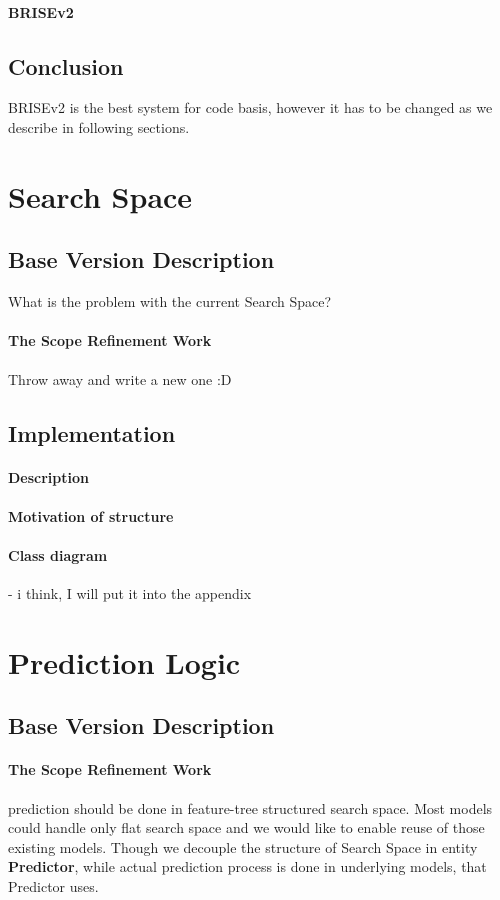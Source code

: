 \paragraph{BRISEv2}
\subsection{Conclusion}
BRISEv2 is the best system for code basis, however it has to be changed as we describe in following sections.


\section{Search Space}\label{implementation: search space}

\subsection{Base Version Description}
What is the problem with the current Search Space?
\paragraph{The Scope Refinement Work} Throw away and write a new one :D

\subsection{Implementation}
\paragraph{Description}
\paragraph{Motivation of structure}
\paragraph{Class diagram} - i think, I will put it into the appendix


\section{Prediction Logic}\label{implementation: prediction logic}
\subsection{Base Version Description}
\paragraph{The Scope Refinement Work} prediction should be done in feature-tree structured search space. Most models could handle only flat search space and we would like to enable reuse of those existing models. Though we decouple the structure of Search Space in entity \textbf{Predictor}, while actual prediction process is done in underlying models, that Predictor uses.


